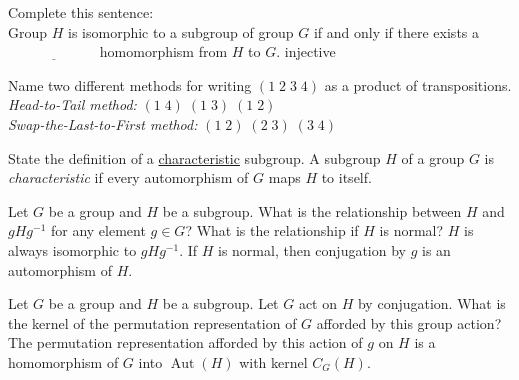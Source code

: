 \documentclass[avery5371,grid]{flashcards}
\newcommand{\inv}{^{-1}}
\newcommand{\blank}{$\; \underline{\hspace{1in}} \; $}
\DeclareMathOperator{\Aut}{Aut}
\begin{document}
\begin{flashcard}[Groups]{Complete this sentence:\\ \vspace{5pt} Group $H$ is isomorphic to a subgroup of group $G$ if and only if there exists a \blank homomorphism from $H$ to $G$.}
 injective
\end{flashcard}

\begin{flashcard}[Groups]{Name two different methods for writing $(1 \; 2 \; 3 \; 4)$ as a product of transpositions.}
 \emph{Head-to-Tail method: } $(1 \; 4) \; (1 \; 3) \; (1 \; 2)$\\
 
 \emph{Swap-the-Last-to-First method: } $(1 \; 2) \; (2 \; 3) \; (3 \; 4)$
\end{flashcard} 

\begin{flashcard}[Groups]{State the definition of a \underline{characteristic} subgroup.}
 A subgroup $H$ of a group $G$ is \emph{characteristic} if every automorphism of $G$ maps $H$ to itself.
\end{flashcard} 

\begin{flashcard}[Groups]{Let $G$ be a group and $H$ be a subgroup. What is the relationship between $H$ and $gH g \inv$ for any element $g \in G$? What is the relationship if $H$ is normal?}
 $H$ is always isomorphic to $g H g \inv.$ If $H$ is normal, then conjugation by $g$ is an automorphism of $H$.
\end{flashcard} 

\begin{flashcard}[Groups]{Let $G$ be a group and $H$ be a subgroup. Let $G$ act on $H$ by conjugation. What is the kernel of the permutation representation of $G$ afforded by this group action?}
 The permutation representation afforded by this action of $g$ on $H$ is a homomorphism of $G$ into $\Aut(H)$ with kernel $C_G(H).$
\end{flashcard} 
\end{document}
